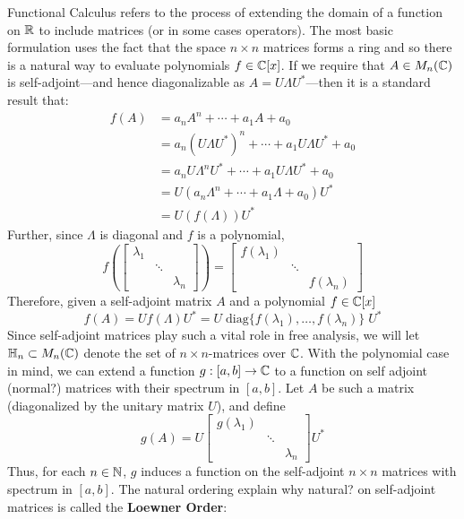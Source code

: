Functional Calculus refers to the process of extending the domain of a function
on \(\mathbb{R}\) to include matrices (or in some cases operators). The most basic
formulation uses the fact that the space \(n \times n\) matrices forms a ring
and so there is a natural way to evaluate polynomials \(f \in \mathbb{C} [x]\). If we
require that $A \in M_n(\mathbb{C})$ is self-adjoint---and hence diagonalizable as
$A = U \Lambda U^*$---then it is a standard result that:
\begin{align*}
  f(A) &= a_nA^n + \cdots + a_1A + a_0 \\
  &= a_n \left( U\Lambda U^* \right) ^n + \cdots + a_1 U\Lambda U^* + a_0 \\
  &= a_n U\Lambda^n U^* + \cdots + a_1 U\Lambda U^* + a_0 \\
  &= U \left( a_n\Lambda ^n + \cdots + a_1\Lambda + a_0 \right) U^* \\
  &= U \left( f(\Lambda) \right) U^*
\end{align*}
Further, since \(\Lambda\) is diagonal and $f$ is a polynomial,
\[
  f \left( \begin{bmatrix} \lambda_1 &  &  \\  & \ddots &  \\  &  & \lambda_n \end{bmatrix}  \right)
  = \begin{bmatrix} f(\lambda_1) &  &  \\  & \ddots &  \\  &  & f(\lambda_n) \end{bmatrix}
\]
Therefore, given a self-adjoint matrix \(A\) and a polynomial \(f \in \mathbb{C} [x]\)
\[
  f(A) = Uf(\Lambda)U^* = U \;\text{diag}\{f(\lambda_{1}), \dots , f(\lambda_n)\} \; U^*
\]
Since self-adjoint matrices play such a vital role in free analysis, we will let
\(\mathbb{H}_n \subset M_n(\mathbb{C})\) denote the set of \(n \times n\)-matrices over \(\mathbb{C} \).
With the polynomial case in mind, we can extend a function \(g: [a,b] \to \mathbb{C} \)
to a function on self adjoint {\color{red} (normal?)} matrices with their
spectrum in \([a,b]\). Let \(A\) be such a matrix (diagonalized by the unitary
matrix \(U\)), and define
\[
  g(A) = U
  \begin{bmatrix} g(\lambda_1) & &\\ &\ddots& \\ & & \lambda_n \end{bmatrix}
  U^*
\]
Thus, for each \(n \in \mathbb{N} \), \(g\) induces a function on the self-adjoint
\(n \times n\) matrices with spectrum in \([a,b]\).  The natural ordering
{\color{red} {explain why natural?}} on self-adjoint matrices is called the
\textbf{Loewner Order}:

